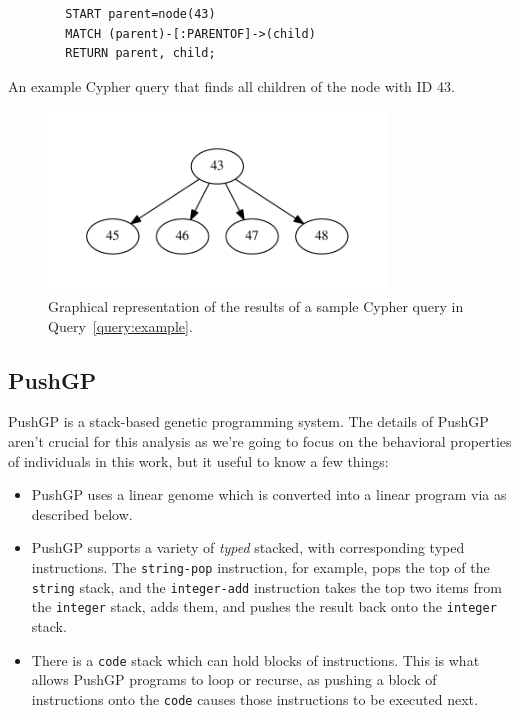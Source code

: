 \begin{Query}[t]
	\smallskip
	\begin{verbatim}
	    START parent=node(43)
	    MATCH (parent)-[:PARENTOF]->(child)
	    RETURN parent, child;
	\end{verbatim}
	\caption{An example Cypher query that finds all children of the node with ID 43.}
	\label{query:example}
\end{Query}

\begin{figure}[tb]
 \sidecaption[t]
 \includegraphics[width=0.8\textwidth]{figures/sample_neo4j_query.pdf}
 \caption{Graphical representation of the results of a sample Cypher query in Query~\ref{query:example}.}
 \label{fig:exampleQuery}
\end{figure}

\subsection{PushGP}

PushGP \citep{spector:2002:GPEM, 1068292} is a stack-based genetic programming system. The details
of PushGP aren't crucial for this analysis as we're going to focus on the behavioral properties of
individuals in this work, but it useful to know a few things:
\begin{itemize}
	\item PushGP uses a linear genome which is converted into a linear program via as described below.
	\item PushGP supports a variety of \emph{typed} stacked, with corresponding typed instructions.
	The \texttt{string-pop} instruction, for example, pops the top of the \texttt{string} stack,
	and the \texttt{integer-add} instruction takes the top two items from the \texttt{integer}
	stack, adds them, and pushes the result back onto the \texttt{integer} stack.
	\item There is a \texttt{code} stack which can hold blocks of instructions. This is what allows
	PushGP programs to loop or recurse, as pushing a block of instructions onto the \texttt{code}
	causes those instructions to be executed next.
\end{itemize}

